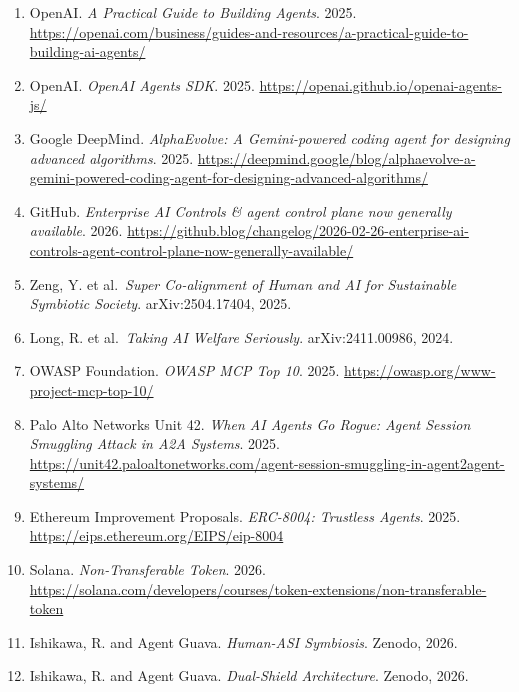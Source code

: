 \documentclass[
]{article}
\providecommand{\tightlist}{%
  \setlength{\itemsep}{0pt}\setlength{\parskip}{0pt}}
\begin{document}
\begin{enumerate}
\def\labelenumi{\arabic{enumi}.}
\tightlist
\item
  OpenAI. \emph{A Practical Guide to Building Agents}. 2025. \url{https://openai.com/business/guides-and-resources/a-practical-guide-to-building-ai-agents/}
\item
  OpenAI. \emph{OpenAI Agents SDK}. 2025. \url{https://openai.github.io/openai-agents-js/}
\item
  Google DeepMind. \emph{AlphaEvolve: A Gemini-powered coding agent for designing advanced algorithms}. 2025. \url{https://deepmind.google/blog/alphaevolve-a-gemini-powered-coding-agent-for-designing-advanced-algorithms/}
\item
  GitHub. \emph{Enterprise AI Controls \& agent control plane now generally available}. 2026. \url{https://github.blog/changelog/2026-02-26-enterprise-ai-controls-agent-control-plane-now-generally-available/}
\item
  Zeng, Y. et al.~\emph{Super Co-alignment of Human and AI for Sustainable Symbiotic Society}. arXiv:2504.17404, 2025.
\item
  Long, R. et al.~\emph{Taking AI Welfare Seriously}. arXiv:2411.00986, 2024.
\item
  OWASP Foundation. \emph{OWASP MCP Top 10}. 2025. \url{https://owasp.org/www-project-mcp-top-10/}
\item
  Palo Alto Networks Unit 42. \emph{When AI Agents Go Rogue: Agent Session Smuggling Attack in A2A Systems}. 2025. \url{https://unit42.paloaltonetworks.com/agent-session-smuggling-in-agent2agent-systems/}
\item
  Ethereum Improvement Proposals. \emph{ERC-8004: Trustless Agents}. 2025. \url{https://eips.ethereum.org/EIPS/eip-8004}
\item
  Solana. \emph{Non-Transferable Token}. 2026. \url{https://solana.com/developers/courses/token-extensions/non-transferable-token}
\item
  Ishikawa, R. and Agent Guava. \emph{Human-ASI Symbiosis}. Zenodo, 2026.
\item
  Ishikawa, R. and Agent Guava. \emph{Dual-Shield Architecture}. Zenodo, 2026.
\end{enumerate}
\end{document}
